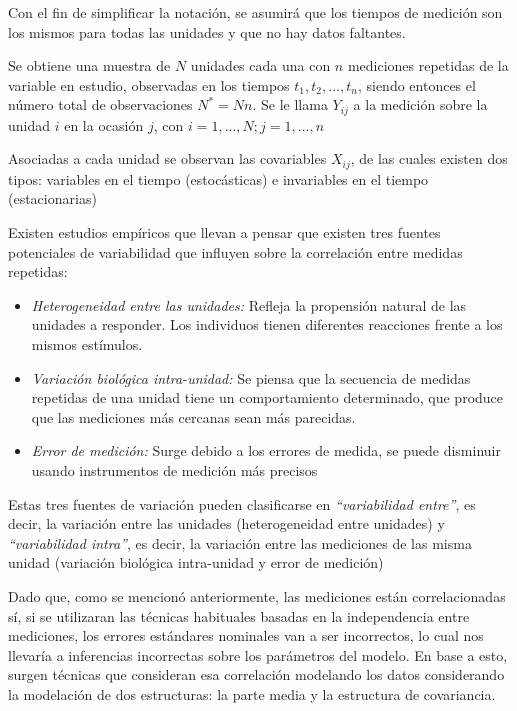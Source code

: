 \documentclass[spanish]{article}
\numberwithin{figure}{subsection}
\numberwithin{equation}{subsection}
\numberwithin{table}{subsection}
\begin{document}
Con el fin de simplificar la notación, se asumirá que los tiempos de medición son los mismos para todas las unidades y
que no hay datos faltantes.

Se obtiene una muestra de $N$ unidades cada una con $n$ mediciones repetidas de la variable en estudio, observadas en los
tiempos $t_1, t_2, ..., t_n$, siendo entonces el número total de observaciones $N^*=Nn$. Se le llama $Y_{ij}$ a la
medición sobre la unidad $i$ en la ocasión $j$, con $i=1, ..., N; j=1, ..., n$

Asociadas a cada unidad se observan las covariables $X_{ij}$, de las cuales existen dos tipos: variables en el tiempo
(estocásticas) e invariables en el tiempo (estacionarias)

Existen estudios empíricos que llevan a pensar que existen tres fuentes potenciales de variabilidad que influyen
sobre la correlación entre medidas repetidas:

\begin{itemize}
	\item \textit{Heterogeneidad entre las unidades:} Refleja la propensión natural de las unidades a responder.
	Los individuos tienen diferentes reacciones frente a los mismos estímulos.
	\item \textit{Variación biológica intra-unidad:} Se piensa que la secuencia de medidas repetidas de una unidad tiene
	un comportamiento determinado, que produce que las mediciones más cercanas sean más parecidas.
	\item \textit{Error de medición:} Surge debido a los errores de medida, se puede disminuir usando instrumentos
	de medición más precisos
\end{itemize}

Estas tres fuentes de variación pueden clasificarse en \textit{``variabilidad entre''}, es decir, la variación entre
las unidades (heterogeneidad entre unidades) y \textit{``variabilidad intra''}, es decir, la variación entre las mediciones
de las misma unidad (variación biológica intra-unidad y error de medición)

Dado que, como se mencionó anteriormente, las mediciones están correlacionadas sí, si se utilizaran las técnicas habituales
basadas en la independencia entre mediciones, los errores estándares nominales van a ser incorrectos, lo cual nos llevaría
a inferencias incorrectas sobre los parámetros del modelo. En base a esto, surgen técnicas que consideran esa correlación
modelando los datos considerando la modelación de dos estructuras: la parte media y la estructura de covariancia.
\end{document}
